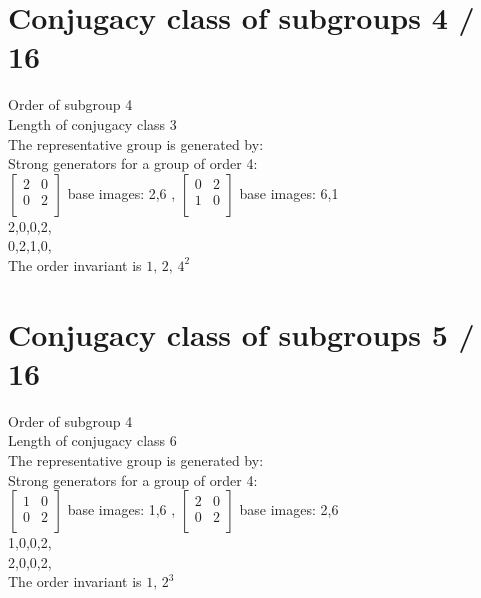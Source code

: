 \section{Conjugacy class of subgroups 4 / 16}
Order of subgroup 4\\
Length of conjugacy class 3\\
The representative group is generated by:\\
Strong generators for a group of order 4:\\
$
\left[
\begin{array}{*{2}{r}}
2 & 0\\
0 & 2\\
\end{array}
\right]
$
base images: 2,6 , 
$
\left[
\begin{array}{*{2}{r}}
0 & 2\\
1 & 0\\
\end{array}
\right]
$
base images: 6,1 \\
2,0,0,2,\\
0,2,1,0,\\
The order invariant is $1,\,2,\,4^2$\\
\section{Conjugacy class of subgroups 5 / 16}
Order of subgroup 4\\
Length of conjugacy class 6\\
The representative group is generated by:\\
Strong generators for a group of order 4:\\
$
\left[
\begin{array}{*{2}{r}}
1 & 0\\
0 & 2\\
\end{array}
\right]
$
base images: 1,6 , 
$
\left[
\begin{array}{*{2}{r}}
2 & 0\\
0 & 2\\
\end{array}
\right]
$
base images: 2,6 \\
1,0,0,2,\\
2,0,0,2,\\
The order invariant is $1,\,2^3$\\
